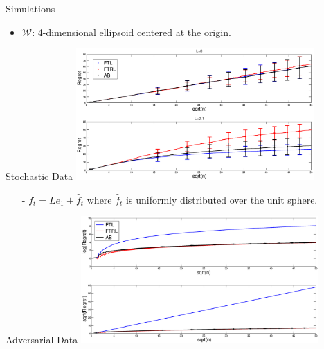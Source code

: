 \documentclass[final]{beamer} %
\newcommand{\cW}{\mathcal{W}}
\newcommand{\hf}{\hat{f}}
\begin{document}
\begin{frame}[c]
\begin{columns}[t,totalwidth=\textwidth]
\begin{column}{0.24\textwidth}
		\vspace{0.0ex}
		\begin{block}{Simulations}	
		\vspace{-0.1cm}
		\begin{itemize}
			\item $\cW$: 4-dimensional ellipsoid centered at the origin.
		\end{itemize}
			\vspace{-0.5cm}	
			\begin{minipage}{.9\linewidth}
				\begin{block}{Stochastic Data}	
					\vspace{-0.8cm}
					\centering
					\includegraphics[width=0.68\textwidth]{figures/ExpResults/Stoc_alt}	
					\footnotesize
					\begin{itemize}
						\item[-] $f_t=L e_1 + \hf_t$ where $\hf_t$ is uniformly distributed over the unit sphere.
						\vspace{-1cm}
					\end{itemize}
				\end{block}	
				\vspace{-0.1cm}	
				\begin{block}{Adversarial Data}	
					\vspace{-0.8cm}
					\centering
					\includegraphics[width=0.68\textwidth]{figures/ExpResults/WorstCase_alt}

\end{block}
\end{minipage}
\end{block}
\end{column}
\end{columns}
\end{frame}
\end{document}
